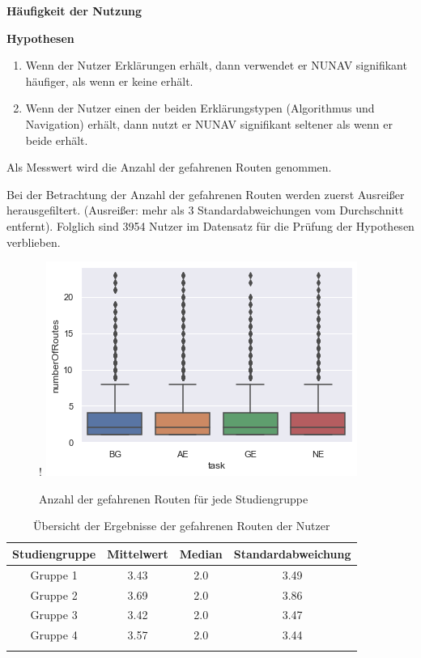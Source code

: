 \textbf{Häufigkeit der Nutzung}

\textbf{Hypothesen}

\begin{enumerate}
    \item Wenn der Nutzer Erklärungen erhält, dann verwendet er NUNAV signifikant häufiger, als wenn er keine erhält.
    \item Wenn der Nutzer einen der beiden Erklärungstypen (Algorithmus und Navigation) erhält, dann nutzt er NUNAV signifikant seltener als wenn er beide erhält.
\end{enumerate}

Als Messwert wird die Anzahl der gefahrenen Routen genommen.

Bei der Betrachtung der Anzahl der gefahrenen Routen werden zuerst Ausreißer herausgefiltert. (Ausreißer: mehr als 3 Standardabweichungen vom Durchschnitt entfernt). Folglich sind 3954 Nutzer im Datensatz für die Prüfung der Hypothesen verblieben.

\begin{figure}[bth]!
    \includegraphics{contents/06_model_evaluation/res/Usage_Result_Overview.png}
    \caption{Anzahl der gefahrenen Routen für jede Studiengruppe}
\end{figure}

\begin{longtable}{|c|c|c|c|}
    \hline
    \textbf{Studiengruppe}  & \textbf{Mittelwert} & \textbf{Median} & \textbf{Standardabweichung} \\ \hline
    Gruppe 1                & 3.43 & 2.0 & 3.49 \\ \hline
    Gruppe 2                & 3.69 & 2.0 & 3.86 \\ \hline
    Gruppe 3                & 3.42 & 2.0 & 3.47 \\ \hline
    Gruppe 4                & 3.57 & 2.0 & 3.44 \\ \hline
\caption{Übersicht der Ergebnisse der gefahrenen Routen der Nutzer}
\label{tab:study_offroute_results}
\end{longtable}

